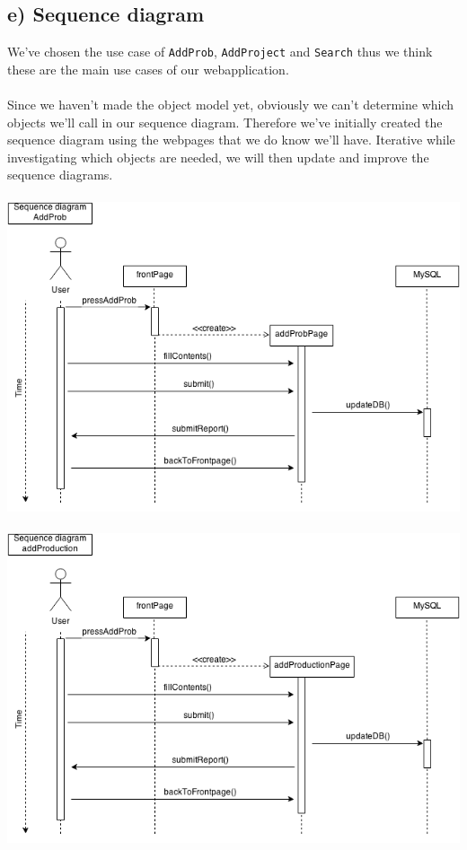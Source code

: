 \documentclass[12pt]{article}
\begin{document}
\subsection*{e) Sequence diagram}
We've chosen the use case of \texttt{AddProb}, \texttt{AddProject} and \texttt{Search} thus we think these are the main use cases of our webapplication.\\\\
Since we haven't made the object model yet, obviously we can't determine which objects we'll call in our sequence diagram. Therefore we've initially created the sequence diagram using the webpages that we do know we'll have. Iterative while investigating which objects are needed, we will then update and improve the sequence diagrams.\\\\
\includegraphics[scale=0.6]{sequenceDiagram_addProb.png}\\\\
\includegraphics[scale=0.6]{sequenceDiagram_addProduction.png}\\\\
\end{document}
